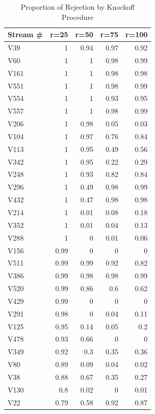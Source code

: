 \documentclass[]{interact}
\theoremstyle{plain}%
\theoremstyle{definition}
\theoremstyle{remark}
\begin{document}
\begin{table}[htbp]
  \centering
  \caption{Proportion of Rejection by Knockoff Procedure}
    \begin{tabular}{lrrrr}
    \toprule
    Stream \# & \multicolumn{1}{r}{r=25} & \multicolumn{1}{r}{r=50} & \multicolumn{1}{r}{r=75} & \multicolumn{1}{r}{r=100} \\
      \midrule
    V39 & 1 & 0.94 & 0.97 & 0.92 \\
    V60 & 1 & 1 & 0.98 & 0.99 \\
    V161 & 1 & 1 & 0.98 & 0.98 \\
    V551 & 1 & 1 & 0.98 & 0.99 \\
    V554 & 1 & 1 & 0.93 & 0.95 \\
    V557 & 1 & 1 & 0.98 & 0.99 \\
    V206 & 1 & 0.98 & 0.05 & 0.03 \\
    V104 & 1 & 0.97 & 0.76 & 0.84 \\
    V113 & 1 & 0.95 & 0.49 & 0.56 \\
    V342 & 1 & 0.95 & 0.22 & 0.29 \\
    V248 & 1 & 0.93 & 0.82 & 0.84 \\
    V296 & 1 & 0.49 & 0.98 & 0.99 \\
    V432 & 1 & 0.47 & 0.98 & 0.98 \\
    V214 & 1 & 0.01 & 0.08 & 0.18 \\
    V352 & 1 & 0.01 & 0.04 & 0.13 \\
    V288 & 1 & 0 & 0.01 & 0.06 \\
    V156 & 0.99 & 0 & 0 & 0 \\
    V511 & 0.99 & 0.99 & 0.92 & 0.82 \\
    V386 & 0.99 & 0.98 & 0.98 & 0.99 \\
    V520 & 0.99 & 0.86 & 0.6 & 0.62 \\
    V429 & 0.99 & 0 & 0 & 0 \\
    V291 & 0.98 & 0 & 0.04 & 0.11 \\
    V125 & 0.95 & 0.14 & 0.05 & 0.2 \\
    V478 & 0.93 & 0.66 & 0 & 0 \\
    V349 & 0.92 & 0.3 & 0.35 & 0.36 \\
    V80 & 0.89 & 0.09 & 0.04 & 0.02 \\
    V38 & 0.88 & 0.67 & 0.35 & 0.27 \\
    V130 & 0.8 & 0.02 & 0 & 0.01 \\
    V22 & 0.79 & 0.58 & 0.92 & 0.87 \\

\end{tabular}
\end{table}
\end{document}
